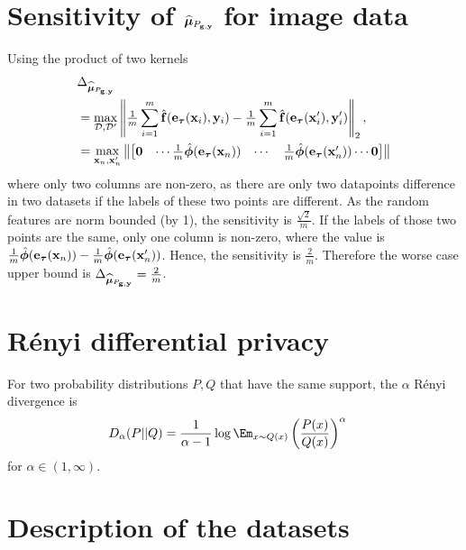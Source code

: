 \documentclass{article}
\begin{document}
\section{Sensitivity of $\widehat{\mathbf{\bm{\mu}}}_{P_{\mathbf{g}, \mathbf{y}}} $ for image data }
%
%
Using the product of two kernels
\begin{align}
  &\Delta_{\widehat{\mathbf{\bm{\mu}}}_{P_{\mathbf{g}, \mathbf{y}}}}\nonumber \\
  &= \max_{\mathcal{D}, \mathcal{D}'} \left\| \tfrac{1}{m}\sum_{i=1}^{m}\hat{\mathbf{f}}(\mathbf{e}_{\mathbf{\bm{\tau}}}(\mathbf{x}_i), \mathbf{y}_i)- \tfrac{1}{m}\sum_{i=1}^{m}\hat{\mathbf{f}}(\mathbf{e}_{\mathbf{\bm{\tau}}}(\mathbf{x}'_i), \mathbf{y}'_i)\right\|_2, \nonumber \\
&= \max_{\mathbf{x}_n, \mathbf{x}_n'}\left\| \begin{bmatrix}
\mathbf{0} & \cdots \frac{1}{m}\hat{\mathbf{\bm{\phi}}}(\mathbf{e}_{\mathbf{\bm{\tau}}}(\mathbf{x}_n)) & \cdots & \frac{1}{m}\hat{\mathbf{\bm{\phi}}}(\mathbf{e}_{\mathbf{\bm{\tau}}}(\mathbf{x}'_n)) \cdots \mathbf{0} 
\end{bmatrix} \right\| \nonumber
\end{align} where only two columns are non-zero, as there are only two datapoints difference in two datasets if the labels of these two points are different.  
As the random features are norm bounded (by 1), the sensitivity is $\frac{\sqrt{2}}{m}$.
If the labels of those two points are the same, only one column is non-zero, where the value is $\frac{1}{m}\hat{\mathbf{\bm{\phi}}}(\mathbf{e}_{\mathbf{\bm{\tau}}}(\mathbf{x}_n)) - \frac{1}{m}\hat{\mathbf{\bm{\phi}}}(\mathbf{e}_{\mathbf{\bm{\tau}}}(\mathbf{x}'_n))$. Hence, the sensitivity is $\frac{2}{m}$. Therefore the worse case upper bound is $\Delta_{\widehat{\mathbf{\bm{\mu}}}_{P_{\mathbf{g}, \mathbf{y}}}} = \frac{2}{m}$.




\section{R\'{e}nyi differential privacy}

\begin{defn} For two probability distributions $P, Q$ that have the same support, the $\alpha$ R\'{e}nyi divergence is 
	\begin{align}
	D_\alpha(P||Q) &= \frac{1}{\alpha-1} \log \Em_{x \sim Q(x)} \left(\frac{P(x)}{Q(x)}\right)^\alpha
	\end{align} for $\alpha \in (1, \infty)$.
\end{defn} 



\section{Description of the datasets}
\label{submission}
\end{document}
